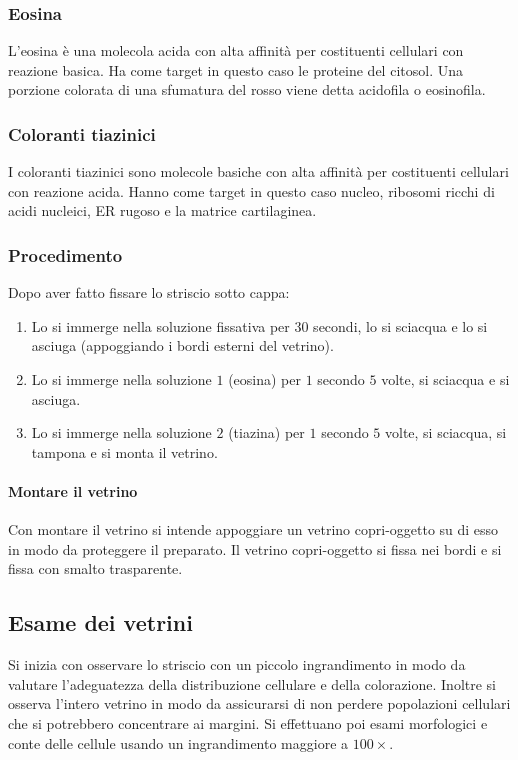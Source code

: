 		\subsubsection{Eosina}
		L'eosina \`e una molecola acida con alta affinit\`a per costituenti cellulari con reazione basica.
		Ha come target in questo caso le proteine del citosol.
		Una porzione colorata di una sfumatura del rosso viene detta acidofila o eosinofila.

		\subsubsection{Coloranti tiazinici}
		I coloranti tiazinici sono molecole basiche con alta affinit\`a per costituenti cellulari con reazione acida.
		Hanno come target in questo caso nucleo, ribosomi ricchi di acidi nucleici, ER rugoso e la matrice cartilaginea.

		\subsubsection{Procedimento}
		Dopo aver fatto fissare lo striscio sotto cappa:
		\begin{multicols}{2}
		\begin{enumerate}
			\item Lo si immerge nella soluzione fissativa per $30$ secondi, lo si sciacqua e lo si asciuga (appoggiando i bordi esterni del vetrino).
			\item Lo si immerge nella soluzione $1$ (eosina) per $1$ secondo $5$ volte, si sciacqua e si asciuga.
			\item Lo si immerge nella soluzione $2$ (tiazina) per $1$ secondo $5$ volte, si sciacqua, si tampona e si monta il vetrino.
		\end{enumerate}
	\end{multicols}

			\paragraph{Montare il vetrino}
			Con montare il vetrino si intende appoggiare un vetrino copri-oggetto su di esso in modo da proteggere il preparato.
			Il vetrino copri-oggetto si fissa nei bordi e si fissa con smalto trasparente. 

	\subsection{Esame dei vetrini}
	Si inizia con osservare lo striscio con un piccolo ingrandimento in modo da valutare l'adeguatezza della distribuzione cellulare e della colorazione.
	Inoltre si osserva l'intero vetrino in modo da assicurarsi di non perdere popolazioni cellulari che si potrebbero concentrare ai margini.
	Si effettuano poi esami morfologici e conte delle cellule usando un ingrandimento maggiore a $100\times$.

